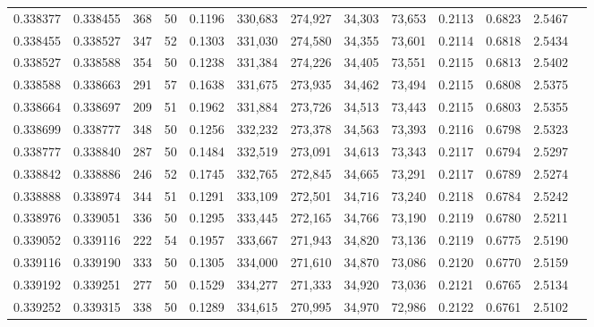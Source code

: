 \begin{tabular}{rrrrrrrrrrrrr}
0.338377 & 0.338455 &   368 &  50 &                                     0.1196 & 330,683 & 274,927 &  34,303 &  73,653 & 0.2113 & 0.6823 & 2.5467 \\
0.338455 & 0.338527 &   347 &  52 &                                     0.1303 & 331,030 & 274,580 &  34,355 &  73,601 & 0.2114 & 0.6818 & 2.5434 \\
0.338527 & 0.338588 &   354 &  50 &                                     0.1238 & 331,384 & 274,226 &  34,405 &  73,551 & 0.2115 & 0.6813 & 2.5402 \\
0.338588 & 0.338663 &   291 &  57 &                                     0.1638 & 331,675 & 273,935 &  34,462 &  73,494 & 0.2115 & 0.6808 & 2.5375 \\
0.338664 & 0.338697 &   209 &  51 &                                     0.1962 & 331,884 & 273,726 &  34,513 &  73,443 & 0.2115 & 0.6803 & 2.5355 \\
0.338699 & 0.338777 &   348 &  50 &                                     0.1256 & 332,232 & 273,378 &  34,563 &  73,393 & 0.2116 & 0.6798 & 2.5323 \\
0.338777 & 0.338840 &   287 &  50 &                                     0.1484 & 332,519 & 273,091 &  34,613 &  73,343 & 0.2117 & 0.6794 & 2.5297 \\
0.338842 & 0.338886 &   246 &  52 &                                     0.1745 & 332,765 & 272,845 &  34,665 &  73,291 & 0.2117 & 0.6789 & 2.5274 \\
0.338888 & 0.338974 &   344 &  51 &                                     0.1291 & 333,109 & 272,501 &  34,716 &  73,240 & 0.2118 & 0.6784 & 2.5242 \\
0.338976 & 0.339051 &   336 &  50 &                                     0.1295 & 333,445 & 272,165 &  34,766 &  73,190 & 0.2119 & 0.6780 & 2.5211 \\
0.339052 & 0.339116 &   222 &  54 &                                     0.1957 & 333,667 & 271,943 &  34,820 &  73,136 & 0.2119 & 0.6775 & 2.5190 \\
0.339116 & 0.339190 &   333 &  50 &                                     0.1305 & 334,000 & 271,610 &  34,870 &  73,086 & 0.2120 & 0.6770 & 2.5159 \\
0.339192 & 0.339251 &   277 &  50 &                                     0.1529 & 334,277 & 271,333 &  34,920 &  73,036 & 0.2121 & 0.6765 & 2.5134 \\
0.339252 & 0.339315 &   338 &  50 &                                     0.1289 & 334,615 & 270,995 &  34,970 &  72,986 & 0.2122 & 0.6761 & 2.5102 \\

\end{tabular}
